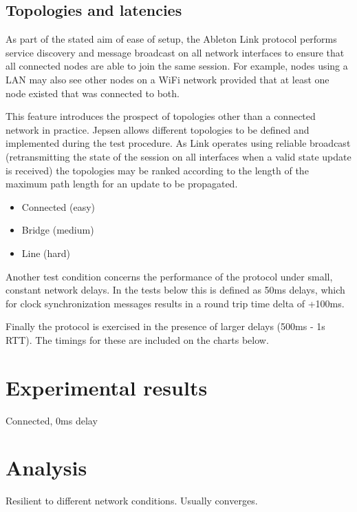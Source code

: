 \documentclass[11pt]{article} %
\theoremstyle{plain}
\theoremstyle{definition}
\begin{document}
\subsection{Topologies and latencies}

As part of the stated aim of ease of setup, the Ableton Link protocol performs
service discovery and message broadcast on all network interfaces to ensure
that all connected nodes are able to join the same session. For example, nodes
using a LAN may also see other nodes on a WiFi network provided that at least
one node existed that was connected to both.

This feature introduces the prospect of topologies other than a connected
network in practice. Jepsen allows different topologies to be defined and
implemented during the test procedure. As Link operates using reliable
broadcast (retransmitting the state of the session on all interfaces when a
valid state update is received) the topologies may be ranked according to the
length of the maximum path length for an update to be propagated.

\begin{itemize}
  \item Connected (easy)
  \item Bridge (medium)
  \item Line (hard)
\end{itemize}

Another test condition concerns the performance of the protocol under small,
constant network delays. In the tests below this is defined as 50ms delays,
which for clock synchronization messages results in a round trip time delta of
+100ms.

Finally the protocol is exercised in the presence of larger delays (500ms - 1s
RTT). The timings for these are included on the charts below.

\section{Experimental results}

Connected, 0ms delay



\section{Analysis}

Resilient to different network conditions. Usually converges.
\end{document}
